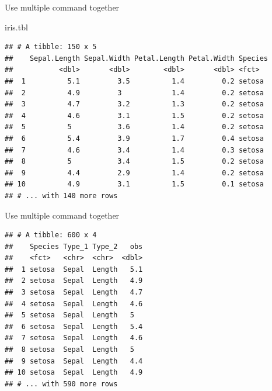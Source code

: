 \documentclass[14pt,ignorenonframetext,]{bredelebeamer}
\newenvironment{Shaded}{\begin{snugshade}}{\end{snugshade}}
\newcommand{\KeywordTok}[1]{\textcolor[rgb]{0.94,0.87,0.69}{#1}}
\newcommand{\DataTypeTok}[1]{\textcolor[rgb]{0.87,0.87,0.75}{#1}}
\newcommand{\CharTok}[1]{\textcolor[rgb]{0.86,0.64,0.64}{#1}}
\newcommand{\StringTok}[1]{\textcolor[rgb]{0.80,0.58,0.58}{#1}}
\newcommand{\OperatorTok}[1]{\textcolor[rgb]{0.94,0.94,0.82}{#1}}
\newcommand{\NormalTok}[1]{\textcolor[rgb]{0.80,0.80,0.80}{#1}}
\begin{document}
\begin{frame}[fragile]{Use multiple command together}

\begin{Shaded}
\begin{Highlighting}[]
\NormalTok{iris.tbl}
\end{Highlighting}
\end{Shaded}

\begin{verbatim}
## # A tibble: 150 x 5
##    Sepal.Length Sepal.Width Petal.Length Petal.Width Species
##           <dbl>       <dbl>        <dbl>       <dbl> <fct>  
##  1          5.1         3.5          1.4         0.2 setosa 
##  2          4.9         3            1.4         0.2 setosa 
##  3          4.7         3.2          1.3         0.2 setosa 
##  4          4.6         3.1          1.5         0.2 setosa 
##  5          5           3.6          1.4         0.2 setosa 
##  6          5.4         3.9          1.7         0.4 setosa 
##  7          4.6         3.4          1.4         0.3 setosa 
##  8          5           3.4          1.5         0.2 setosa 
##  9          4.4         2.9          1.4         0.2 setosa 
## 10          4.9         3.1          1.5         0.1 setosa 
## # ... with 140 more rows
\end{verbatim}

\end{frame}

\begin{frame}[fragile]{Use multiple command together}

\begin{Shaded}
\end{Shaded}

\begin{verbatim}
## # A tibble: 600 x 4
##    Species Type_1 Type_2   obs
##    <fct>   <chr>  <chr>  <dbl>
##  1 setosa  Sepal  Length   5.1
##  2 setosa  Sepal  Length   4.9
##  3 setosa  Sepal  Length   4.7
##  4 setosa  Sepal  Length   4.6
##  5 setosa  Sepal  Length   5  
##  6 setosa  Sepal  Length   5.4
##  7 setosa  Sepal  Length   4.6
##  8 setosa  Sepal  Length   5  
##  9 setosa  Sepal  Length   4.4
## 10 setosa  Sepal  Length   4.9
## # ... with 590 more rows
\end{verbatim}

\end{frame}
\end{document}
